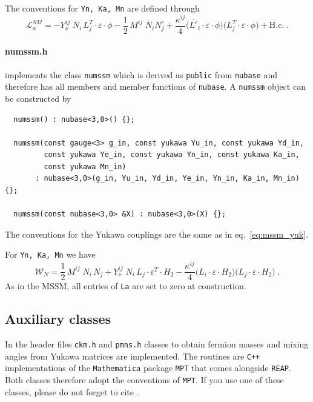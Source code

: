 \documentclass[preprint,12pt]{elsarticle}
\begin{document}
The conventions for \texttt{Yn, Ka, Mn} are defined through
\begin{equation}\label{eq:sm_nu}
  \mathcal{L}_{\kappa}^{SM} = - Y_\nu^{ij}\; \overline{N}_i\, L_j^T \cdot \varepsilon \cdot \phi -\frac{1}{2}\, M^{ij}\; \overline{N}_i N^c_j  + \frac{\kappa^{ij}}{4} \bigl(\overline{L^c}_i\cdot \varepsilon \cdot \phi \bigr) \bigl(L_j^T\cdot \varepsilon \cdot \phi \bigr) + \mathrm{H.c.} \;.
\end{equation}

\paragraph{numssm.h}
implements the class \texttt{numssm} which is derived as \texttt{public} from \texttt{nubase} and therefore has all members and member functions of \texttt{nubase}. A \texttt{numssm} object can be constructed by
\begin{lstlisting}
  numssm() : nubase<3,0>() {};
  
  numssm(const gauge<3> g_in, const yukawa Yu_in, const yukawa Yd_in,
         const yukawa Ye_in, const yukawa Yn_in, const yukawa Ka_in,
         const yukawa Mn_in)
       : nubase<3,0>(g_in, Yu_in, Yd_in, Ye_in, Yn_in, Ka_in, Mn_in) {};
  
  numssm(const nubase<3,0> &X) : nubase<3,0>(X) {};
\end{lstlisting}
The conventions for the Yukawa couplings are the same as in eq.~\eqref{eq:mssm_yuk}.

For \texttt{Yn, Ka, Mn} we have
\begin{equation} \label{eq:mssm_nu}
    \mathcal{W}_{N} = \frac{1}{2}\, M^{ij}\; N_i\, N_j + Y_\nu^{ij}\; N_i\, L_j \cdot \varepsilon^T \cdot H_2 -\frac{\kappa^{ij}}{4} \bigl(L_i\cdot \varepsilon \cdot H_2\bigr) \bigl(L_j\cdot \varepsilon \cdot H_2\bigr)\;.
\end{equation}
As in the MSSM, all entries of \texttt{La} are set to zero at construction.

\subsection{\label{sec::auxiliary} Auxiliary classes}
In the header files \texttt{ckm.h} and \texttt{pmns.h} classes to obtain fermion masses and mixing angles from Yukawa matrices are implemented. The routines are \texttt{C++} implementations of the \texttt{Mathematica} package \texttt{MPT} that comes alongside \texttt{REAP}. Both classes therefore adopt the conventions of \texttt{MPT}. If you use one of these classes, please do not forget to cite \cite{Antusch:2005gp}.
\end{document}
